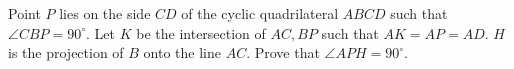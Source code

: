 \begin{problem}
    Point $P$ lies on the side $CD$ of the cyclic quadrilateral $ABCD$ such that $\angle CBP = 90^{\circ}$. Let $K$ be the intersection of $AC,BP$ such that $AK = AP = AD$. $H$ is the projection of $B$ onto the line $AC$. Prove that $\angle APH = 90^{\circ}$.

    \label{24IGOA2}
\end{problem}